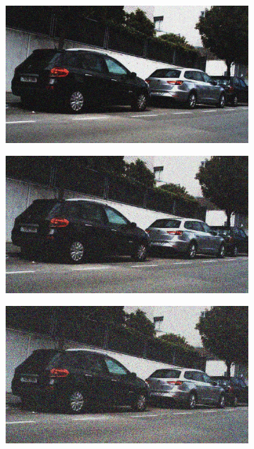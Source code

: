 \documentclass[a4paper]{ctexart}
\begin{document}
\begin{figure}[htbp]
\begin{subfigure}{0.08\textwidth}
			\label{fig：Gamma=0.3, Gauss Noise = 0.1}
		\end{subfigure}
		\begin{subfigure}{0.08\textwidth}
			\captionsetup{font=scriptsize}
			\includegraphics[width=\linewidth]{picture/Edge Detection/degrade/RGB_001 Gamma=0.3, Gauss Noise=0.2}
			\label{fig：Gamma=0.3, Gauss Noise = 0.2}
		\end{subfigure}
		\begin{subfigure}{0.08\textwidth}
			\captionsetup{font=scriptsize}
			\includegraphics[width=\linewidth]{picture/Edge Detection/degrade/RGB_001 Gamma=0.3, Gauss Noise=0.3}
			\label{fig：Gamma=0.3, Gauss Noise = 0.3}
		\end{subfigure}
		\begin{subfigure}{0.08\textwidth}
			\captionsetup{font=scriptsize}
			\includegraphics[width=\linewidth]{picture/Edge Detection/degrade/RGB_001 Gamma=0.3, Gauss Noise=0.4}

\end{subfigure}
\end{figure}
\end{document}
